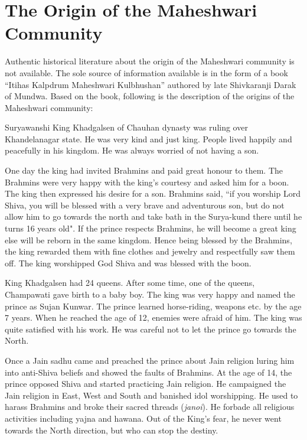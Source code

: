 \chapter{The Origin of the Maheshwari Community}
Authentic historical literature about the origin of the Maheshwari community is not available. The sole source of information available is in the form of a book ``Itihas Kalpdrum Maheshwari Kulbhushan'' authored by late Shivkaranji Darak of Mundwa. Based on the book, following is the description of the origins of the Maheshwari community:

Suryawanshi King Khadgalsen of Chauhan dynasty was ruling over Khandelanagar state. He was very kind and just king. People lived happily and peacefully in his kingdom. He was always worried of not having a son.

One day the king had invited Brahmins and paid great honour to them. The Brahmins were very happy with the king's courtesy and asked him for a boon. The king then expressed his desire for a son. Brahmins said, ``if you worship Lord Shiva, you will be blessed with a very brave and adventurous son, but do not allow him to go towards the north and take bath in the Surya-kund there until he turns 16 years old". If the prince respects Brahmins, he will become a great king else will be reborn in the same kingdom. Hence being blessed by the Brahmins, the king rewarded them with fine clothes and jewelry and respectfully saw them off. The king worshipped God Shiva and was blessed with the boon.

King Khadgalsen had 24 queens. After some time, one of the queens, Champawati gave birth to a baby boy. The king was very happy and named the prince as Sujan Kunwar. The prince learned horse-riding, weapons etc. by the age 7 years. When he reached the age of 12, enemies were afraid of him. The king was quite satisfied with his work. He was careful not to let the prince go towards the North.

Once a Jain sadhu came and preached the prince about Jain religion luring him into anti-Shiva beliefs and showed the faults of Brahmins. At the age of 14, the prince opposed Shiva and started practicing Jain religion. He campaigned the Jain religion in East, West and South and banished idol worshipping. He used to harass Brahmins and broke their sacred threads (\textit{janoi}). He forbade all religious activities including yajna and hawana. Out of the King's fear, he never went towards the North direction, but who can stop the destiny.

